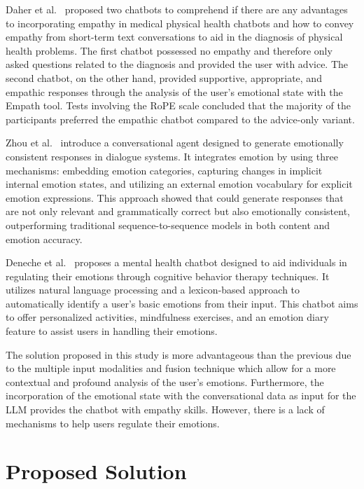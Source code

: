 \documentclass[runningheads]{llncs}
\begin{document}
Daher et al.~\cite{daher_empathic_nodate} proposed two chatbots to comprehend if there are any advantages to incorporating empathy in medical physical health chatbots and how to convey empathy from short-term text conversations to aid in the diagnosis of physical health problems. The first chatbot possessed no empathy and therefore only asked questions related to the diagnosis and provided the user with advice. The second chatbot, on the other hand, provided supportive, appropriate, and empathic responses through the analysis of the user's emotional state with the Empath tool. Tests involving the RoPE scale concluded that the majority of the participants preferred the empathic chatbot compared to the advice-only variant.

Zhou et al.~\cite{Zhou2018} introduce a conversational agent designed to generate emotionally consistent responses in dialogue systems. It integrates emotion by using three mechanisms: embedding emotion categories, capturing changes in implicit internal emotion states, and utilizing an external emotion vocabulary for explicit emotion expressions. This approach showed that could generate responses that are not only relevant and grammatically correct but also emotionally consistent, outperforming traditional sequence-to-sequence models in both content and emotion accuracy.

Deneche et al.~\cite{Denecke2021} proposes a mental health chatbot designed to aid individuals in regulating their emotions through cognitive behavior therapy techniques. It utilizes natural language processing and a lexicon-based approach to automatically identify a user's basic emotions from their input. This chatbot aims to offer personalized activities, mindfulness exercises, and an emotion diary feature to assist users in handling their emotions.

The solution proposed in this study is more advantageous than the previous due to the multiple input modalities and fusion technique which allow for a more contextual and profound analysis of the user's emotions. Furthermore, the incorporation of the emotional state with the conversational data as input for the LLM provides the chatbot with empathy skills. However, there is a lack of mechanisms to help users regulate their emotions.

\section{Proposed Solution}
\label{sec:solution}
\end{document}
